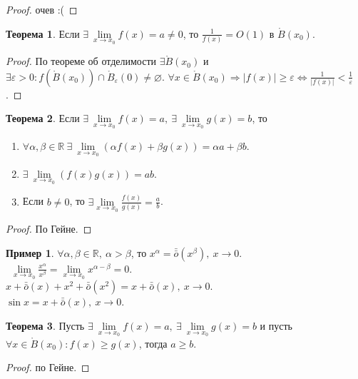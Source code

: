 \documentclass[a4paper, 12pt]{article}
\newcommand{\R}{\mathbb{R}}
\newcommand{\Bo}{\mathring{B}}
\renewcommand{\epsilon}{\varepsilon}
\renewcommand{\emptyset}{\varnothing}
\newcommand{\om}{\bar{\bar{o}}}
\theoremstyle{definition}
\newtheorem*{theorem}{Теорема}
\newtheorem*{example}{Пример}
\begin{document}
        \begin{proof}
            очев :(
        \end{proof}
        \begin{theorem}
            Если $\exists\ \lim\limits_{x\to x_0}f(x)=a\ne 0$, то $\frac{1}{f(x)}=O(1)$ в $\Bo(x_0)$.
        \end{theorem} 
        \begin{proof}
            По теореме об отделимости $\exists \Bo(x_0)$ и $\exists \epsilon>0: f(\Bo(x_0))\cap \Bo_{\epsilon}(0)\ne \emptyset$. $\forall x\in \Bo(x_0) \Rightarrow |f(x)|\geq \epsilon \Leftrightarrow \frac{1}{|f(x)|}<\frac{1}{\epsilon}$. 
        \end{proof} 
        \begin{theorem}
            Если $\exists\ \lim\limits_{x\to x_0}f(x)=a,\ \exists\ \lim\limits_{x\to x_0}g(x)=b$, то
            \begin{enumerate}
                \item $\forall \alpha,\beta\in \R\ \exists\ \lim\limits_{x\to x_0}(\alpha f(x)+\beta g(x))=\alpha a+\beta b$.
                \item $\exists\ \lim\limits_{x\to x_0}(f(x)g(x))=ab$.
                \item Если $b\ne 0$, то $\exists \lim\limits_{x\to x_0}\frac{f(x)}{g(x)}=\frac{a}{b}$.
            \end{enumerate}
        \end{theorem} 
        \begin{proof}
            По Гейне.
        \end{proof}
        \begin{example}
            $\forall \alpha, \beta\in \R,\ \alpha>\beta$, то $x^{\alpha}=\om(x^{\beta}),\ x\to 0$.\\\
            $\lim\limits_{x\to x_0}\frac{x^{\alpha}}{x^{\beta}}=\lim\limits_{x\to x_0}x^{\alpha-\beta}=0$.\\
            $x+\om(x)+x^2+\om(x^2)=x+\om(x),\ x\to 0$.\\
            $\sin{x}=x+\om(x),\ x\to 0$.
        \end{example}
        \begin{theorem}
            Пусть $\exists\ \lim\limits_{x\to x_0}f(x)=a,\ \exists\ \lim\limits_{x\to x_0}g(x)=b$ и пусть $\forall x\in \Bo(x_0): f(x)\geq g(x)$, тогда $a\geq b$.
        \end{theorem} 
        \begin{proof}
            по Гейне.
        \end{proof} 
\end{document}
